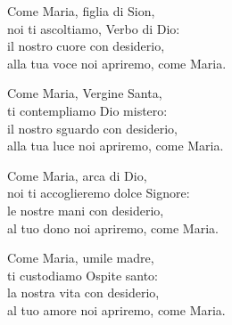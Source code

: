 
\strofa Come Maria, figlia di Sion,\\
noi ti ascoltiamo, Verbo di Dio:\\
il nostro cuore con desiderio,\\
alla tua voce noi apriremo, come Maria.

\spazio

\strofa Come Maria, Vergine Santa,\\
ti contempliamo Dio mistero:\\
il nostro sguardo con desiderio,\\
alla tua luce noi apriremo, come Maria.

\spazio

\strofa Come Maria, arca di Dio,\\
noi ti accoglieremo dolce Signore:\\
le nostre mani con desiderio,\\
al tuo dono noi apriremo, come Maria.

\spazio

\strofa Come Maria, umile madre,\\
ti custodiamo Ospite santo:\\
la nostra vita con desiderio,\\
al tuo amore noi apriremo, come Maria.
